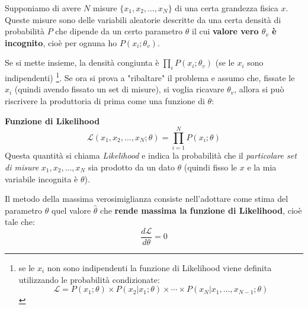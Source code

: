 \documentclass[openany,a4paper,12pt]{book}
\providecommand{\mathscr}[1]{\mathcal{#1}}
\theoremstyle{remark}
\begin{document}
Supponiamo di avere $N$ misure $\{x_1, x_2, \dots, x_N\}$ di una certa grandezza fisica $x$. Queste misure sono delle variabili aleatorie descritte da una certa densità di probabilità $P$ che dipende da un certo parametro $\theta$ il cui \textbf{valore vero $\theta_v$ è incognito}, cioè per ognuna ho $P(x_i ; \theta_v)$.

Se si mette insieme, la densità congiunta è $\prod_i P(x_i ; \theta_v)$ (se le $x_i$ sono indipendenti) \footnote{se le $x_i$ non sono indipendenti la funzione di Likelihood viene definita utilizzando le probabilità condizionate: 
\[\mathcal{L} = P(x_1; \theta) \times  P(x_2 | x_1; \theta) \times \cdots \times P(x_N | x_1, \dots, x_{N-1}; \theta)\]}. 
Se ora si prova a "ribaltare" il problema e assumo che, fissate le $x_i$ (quindi avendo fissato un set di misure), si voglia ricavare $\theta_v$, allora si può  riscrivere la produttoria di prima come una funzione di $\theta$:

\begin{definizione}\textbf{Funzione di Likelihood}
\begin{equation}
\mathscr{L}(x_1, x_2, \dots, x_N ; \theta) = \prod_{i=1}^N P(x_i ; \theta)
\end{equation}
Questa quantità si chiama \emph{Likelihood} e indica la probabilità che il \emph{particolare set di misure} $x_1, x_2, \dots, x_N$ sia prodotto da un dato $\theta$ (quindi fisso le $x$ e la mia variabile incognita è $\theta$).
\end{definizione}

Il metodo della massima verosimiglianza consiste nell'adottare come stima del parametro $\theta$ quel valore $\hat{\theta}$ che \textbf{rende massima la funzione di Likelihood}, cioè tale che:
\begin{equation}
\frac{d\mathscr{L}}{d\theta} = 0
\end{equation}
\end{document}
